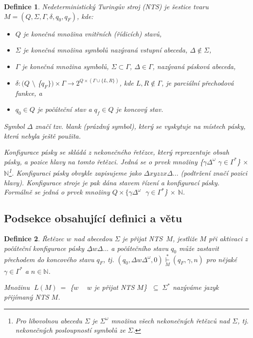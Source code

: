 \documentclass[a4paper, 11pt, twocolumn]{article}
\theoremstyle{plain}
\newtheorem{definition}{Definice}
\theoremstyle{plain}
\begin{document}
    \begin{definition}
        \label{NTS}
        {\normalfont Nedeterministický Turingův stroj} (NTS) je šestice tvaru $ M =  (Q, \Sigma, \Gamma, \delta, q_0, q_F)$, kde:
        
        \begin{itemize}
        \item $Q$ je konečná množina {\normalfont vnitřních (řídicích) stavů},
        \item $\Sigma$ je konečná množina symbolů nazývaná {\normalfont vstupní abeceda}, $\Delta \not\in \Sigma$,
        \item $\Gamma$ je konečná množina symbolů, $\Sigma \subset \Gamma$, $\Delta \in \Gamma$, nazývaná {\normalfont pásková abeceda},
        \item $\delta : (Q$ $\setminus$ \{$q_F \}) \times \Gamma \rightarrow 2^{Q\times(\Gamma\cup\{L,R\})}$, kde $L, R \not\in \Gamma$, je parciální {\normalfont přechodová funkce}, a
        \item $q_0 \in Q$ je {\normalfont počáteční stav} a $q_f \in Q$ je {\normalfont koncový stav}.
        \end{itemize}
        
        {\normalfont Symbol $\Delta$ značí tzv.} blank {\normalfont (prázdný symbol), který se vyskytuje na místech pásky, která nebyla ještě použita.}
        
        Konfigurace pásky {\normalfont se skládá z nekonečného řetězce, který reprezentuje obsah pásky, a pozice hlavy na tomto řetězci. Jedná se o prvek množiny} \{$\gamma \Delta^\omega$ \textbar \;$\gamma \in \Gamma^{\ast}$\} $\times$ $\mathbb{N}$\footnote{Pro libovolnou abecedu $\Sigma$ je $\Sigma^\omega$ množina všech \emph{nekonečných} řetězců nad $\Sigma$, tj. nekonečných posloupností symbolů ze $\Sigma$. }.
        Konfiguraci pásky {\normalfont obvykle zapisujeme jako $\Delta xyz$\underline{$z$}$x\Delta...$ (podtržení značí pozici hlavy).} Konfigurace stroje {\normalfont je pak dána stavem řízení a konfigurací pásky. Formálně se jedná o prvek množiny $Q \times \{ \gamma \Delta^\omega$ \textbar $\;\gamma \in \Gamma^{\ast}$\} $\times$ $\mathbb{N}$}.
    \end{definition}
    
    \subsection{Podsekce obsahující definici a větu}
    \begin{definition}
        \label{abecedaOmega}
        {\normalfont Řetězec $w$ nad abecedou $\Sigma$ je přijat NTS~$M$}, jestliže $M$ při aktivaci z počáteční konfigurace pásky $\underline{\Delta}w\Delta...$ a počátečního stavu $q_0$ může zastavit přechodem do koncového stavu $q_F$,  tj. $(q_0, \Delta w\Delta^\omega, 0) \underset{M}{\overset{*}{\vdash}} (q_F, \gamma, n)$ pro nějaké $\gamma \in \Gamma^\ast$ a $n \in \mathbb{N}$.
        
        Množinu $\;L(M)\ = $\; \{$w\ \ $\textbar $\ \ $ $w$ je přijat NTS $M$\} $\; \subseteq \; \Sigma^\ast$ nazýváme {\normalfont jazyk přijímaný NTS} $M$.
    \end{definition}
    
\end{document}
